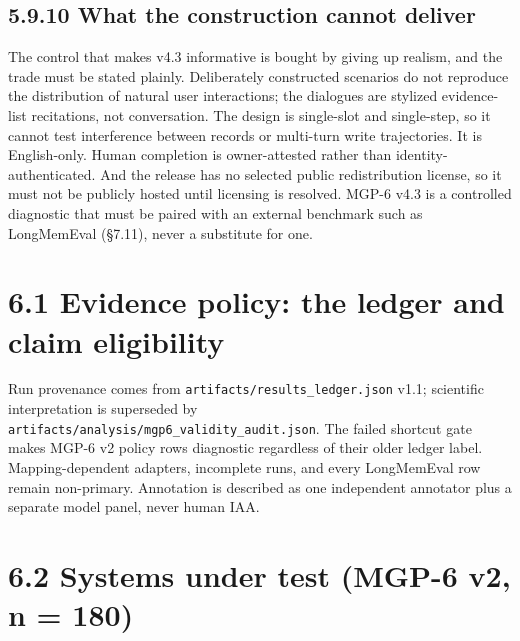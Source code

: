 \subsection{5.9.10 What the construction cannot
deliver}\label{what-the-construction-cannot-deliver}

The control that makes v4.3 informative is bought by giving up realism,
and the trade must be stated plainly. Deliberately constructed scenarios
do not reproduce the distribution of natural user interactions; the
dialogues are stylized evidence-list recitations, not conversation. The
design is single-slot and single-step, so it cannot test interference
between records or multi-turn write trajectories. It is English-only.
Human completion is owner-attested rather than identity-authenticated.
And the release has no selected public redistribution license, so it
must not be publicly hosted until licensing is resolved. MGP-6 v4.3 is a
controlled diagnostic that must be paired with an external benchmark
such as LongMemEval (§7.11), never a substitute for one.

\section{6.1 Evidence policy: the ledger and claim
eligibility}\label{evidence-policy-the-ledger-and-claim-eligibility}

Run provenance comes from \texttt{artifacts/results\_ledger.json} v1.1;
scientific interpretation is superseded by
\texttt{artifacts/analysis/mgp6\_validity\_audit.json}. The failed
shortcut gate makes MGP-6 v2 policy rows diagnostic regardless of their
older ledger label. Mapping-dependent adapters, incomplete runs, and
every LongMemEval row remain non-primary. Annotation is described as one
independent annotator plus a separate model panel, never human IAA.

\section{6.2 Systems under test (MGP-6 v2, n =
180)}\label{systems-under-test-mgp-6-v2-n-180}

